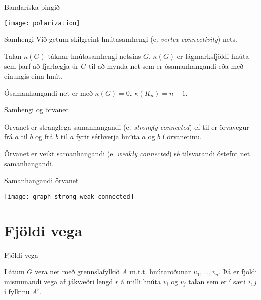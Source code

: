 \documentclass{beamer}
\begin{document}
\begin{frame}{Bandaríska þingið}
    \begin{center}
        \texttt{[image: polarization]}
    \end{center}
\end{frame}

\begin{frame}{Samhengi}
Við getum skilgreint hnútasamhengi (e. \emph{vertex connectivity}) nets.

\begin{tcolorbox}[title=Samhengi]
Talan $\kappa(G)$ táknar hnútasamhengi netsins $G$. $\kappa(G)$ er lágmarksfjöldi hnúta sem þarf að fjarlægja úr $G$ til að mynda net sem er ósamanhangandi eða með einungis einn hnút.
\end{tcolorbox}
Ósamanhangandi net er með $\kappa(G) = 0$. $\kappa(K_n) = n-1$.
\end{frame}

\begin{frame}{Samhengi og örvanet}
\begin{tcolorbox}[title=Stranglega samanhangandi örvanet]
Örvanet er stranglega samanhangandi (e. \emph{strongly connected}) ef til er örvavegur frá $a$ til $b$ og frá $b$ til $a$ fyrir sérhverja hnúta $a$ og $b$ í örvanetinu.
\end{tcolorbox}

\begin{tcolorbox}[title=Veikt samanhangandi örvanet]
Örvanet er veikt samanhangandi (e. \emph{weakly connected}) sé tilsvarandi óstefnt net samanhangandi.
\end{tcolorbox}
\end{frame}

\begin{frame}{Samanhangandi örvanet}
\begin{center}
\texttt{[image: graph-strong-weak-connected]}
\end{center}
\end{frame}
\section{Fjöldi vega}
\begin{frame}{Fjöldi vega}
\begin{tcolorbox}
Látum $G$ vera net með grennslafylkið $A$ m.t.t. hnútaröðunar $v_1, \ldots, v_n$. Þá er fjöldi mismunandi vega af jákvæðri lengd $r$ á milli hnúta $v_i$ og $v_j$ talan sem er í sæti $i,j$ í fylkinu $A^r$.
\end{tcolorbox}
\end{frame}
\end{document}
